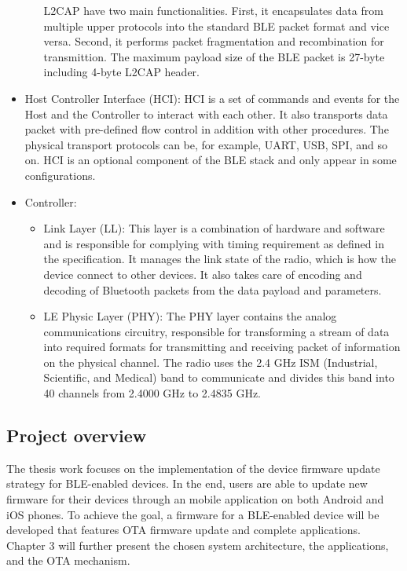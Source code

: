 \begin{itemize}
\begin{itemize}
                L2CAP have two main functionalities.
                First, it encapsulates data from multiple upper protocols
                into the standard BLE packet format and vice versa. 
                Second, it performs packet fragmentation and recombination for
                transmittion.
                The maximum payload size of the BLE packet is 27-byte including
                4-byte L2CAP header. \cite[p.~25]{TCAD14}
        \end{itemize}
    \item Host Controller Interface (HCI):
        HCI is a set of commands and events for the Host and the Controller
        to interact with each other. It also transports data packet with 
        pre-defined flow control in addition with other procedures.
        The physical transport protocols can be, for example, UART, USB, 
        SPI, and so on. HCI is an optional component of the BLE stack and 
        only appear in some configurations. \cite[p.~24-25]{TCAD14}    
    \item Controller:
        \begin{itemize}
            \item Link Layer (LL):
                This layer is a combination of hardware and software and is 
                responsible for complying with timing requirement as defined
                in the specification. It manages the link state of the radio,
                which is how the device connect to other devices.
                It also takes care of encoding and decoding of Bluetooth packets 
                from the data payload and parameters. \cite[p.~17-18]{TCAD14} 
            \item LE Physic Layer (PHY):
                The PHY layer contains the analog communications circuitry,
                responsible for transforming a stream of data into required
                formats for transmitting and receiving packet of information
                on the physical channel. 
                The radio uses the 2.4 GHz ISM (Industrial, Scientific, and 
                Medical) band to communicate and divides this band into
                40 channels from 2.4000 GHz to 2.4835 GHz. \cite[p.~200]{Ble19}
        \end{itemize}
\end{itemize}

\subsection{Project overview}
\justify
The thesis work focuses on the implementation of the device firmware update strategy 
for BLE-enabled devices. In the end, users are able to update new firmware for their
devices through an mobile application on both Android and iOS phones. To achieve the
goal, a firmware for a BLE-enabled device will be developed that features OTA 
firmware update and complete applications. Chapter 3 will further present the chosen
system architecture, the applications, and the OTA mechanism. 

